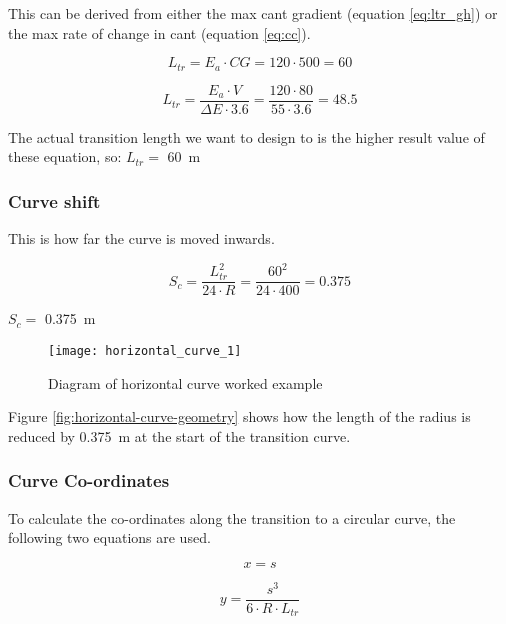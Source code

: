 \documentclass{bcrre_exam}
\begin{document}
This can be derived from either the max cant gradient (equation \ref{eq:ltr_gh}) or the max rate of change in cant (equation \ref{eq:cc}).

\begin{equation}
    \label{eq:ltr_gh}
    L_{tr} = E_a \cdot CG = 120 \cdot 500 = 60
\end{equation}

\begin{equation}
    \label{eq:cc}
    L_{tr} = \frac{E_a \cdot V}{\Delta E \cdot 3.6} = \frac{120 \cdot 80}{55 \cdot 3.6} = 48.5
\end{equation}

The actual transition length we want to design to is the higher result value of these equation, so: $L_{tr}=$ \qty{60}{m} 

\subsubsection*{Curve shift}

This is how far the curve is moved inwards.

\begin{equation}
    S_c=\frac{L_{tr}^2}{24 \cdot R} = \frac{60^2}{24 \cdot 400} = 0.375
\end{equation}

$S_c=$ \qty{0.375}{m}

\begin{figure}[h]
    \centering
    \texttt{[image: horizontal\_curve\_1]}
    \caption{Diagram of horizontal curve worked example}
    \label{fig:hoz-cur-example}
\end{figure}

Figure \ref{fig:horizontal-curve-geometry} shows how the length of the radius is reduced by \qty{0.375}{m} at the start of the transition curve.

\subsubsection*{Curve Co-ordinates}

To calculate the co-ordinates along the transition to a circular curve, the following two equations are used.

\begin{equation}
    x=s
\end{equation}

\begin{equation}
    y=\frac{s^3}{6 \cdot R \cdot L_{tr}}
\end{equation}
\end{document}
